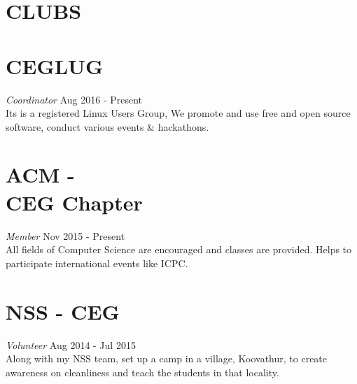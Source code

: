 \documentclass[margin, 10pt]{res} %
\begin{document}
\begin{resume}
\section{CLUBS}
\section{\hspace{05pt} CEGLUG}
{\sl Coordinator} \hfill Aug 2016 - Present\\
Its is a registered Linux Users Group, We promote and use free and open source software, conduct various events \& hackathons.
\section{\hspace{05pt}ACM -\\ \hspace{05pt}CEG Chapter}
{\sl Member} \hfill Nov 2015 - Present\\
All fields of Computer Science are encouraged and classes are provided. Helps to participate international events like ICPC.
\section{\hspace{05pt}NSS - CEG}
{\sl Volunteer} \hfill Aug 2014 - Jul 2015\\
Along with my NSS team, set up a camp in a village, Koovathur, to create awareness on cleanliness and teach the students in that locality.


\end{resume}
\end{document}

